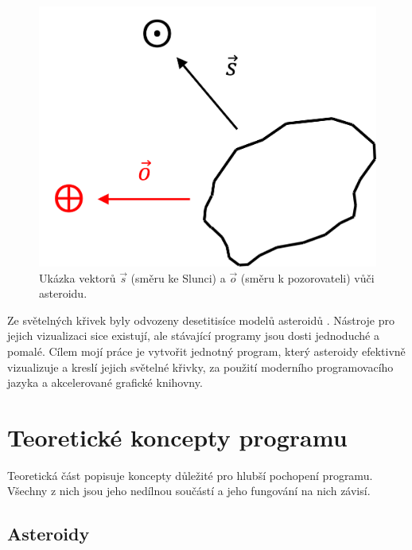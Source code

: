 \documentclass[11pt]{article}
\begin{document}
\begin{figure}[h]
\includegraphics[scale=0.425]{figs/schema.png}
\centering
\caption{Ukázka vektorů $\vec s$ (směru ke Slunci) a $\vec o$ (směru k pozorovateli) vůči asteroidu.}
\label{schema}
\end{figure}

Ze světelných křivek byly odvozeny desetitisíce modelů asteroidů \cite{Durech_2023A&A...675A..24D,Broz_2023A&A...676A..60B}. Nástroje pro jejich vizualizaci sice existují, ale stávající programy jsou dosti jednoduché a pomalé. Cílem mojí práce je vytvořit jednotný program, který asteroidy efektivně vizualizuje a kreslí jejich světelné křivky, za použití moderního programovacího jazyka a akcelerované grafické knihovny. 

\newpage
\section{Teoretické koncepty programu}

Teoretická část popisuje koncepty důležité pro hlubší pochopení programu. Všechny z nich jsou jeho nedílnou součástí a jeho fungování na nich závisí. 

\subsection{Asteroidy}
\end{document}

